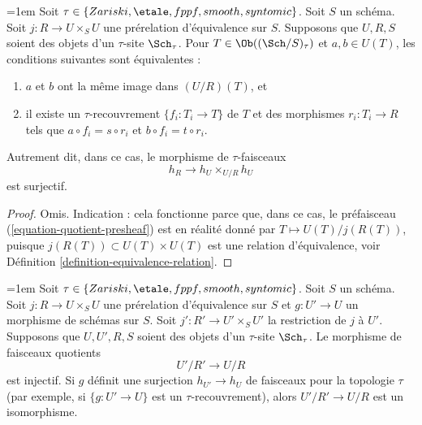 \begin{lemma}\emergencystretch=1em
\label{lemma-quotient-pre-equivalence}
Soit $\tau \in\allowbreak \{Zariski,\allowbreak \etale,\allowbreak fppf,\allowbreak smooth,\allowbreak syntomic\}$.
Soit $S$ un schéma.
Soit $j : R \to U \times_S U$ une prérelation d'équivalence sur $S$.
Supposons que $U, R, S$ soient des objets d'un $\tau$-site $\Sch_\tau$.
Pour $T \in \Ob((\Sch/S)_\tau)$ et
$a, b \in U(T)$, les conditions suivantes sont équivalentes :
\begin{enumerate}
\item $a$ et $b$ ont la même image dans $(U/R)(T)$, et
\item il existe un $\tau$-recouvrement $\{f_i : T_i \to T\}$ de $T$
et des morphismes $r_i : T_i \to R$ tels que
$a \circ f_i = s \circ r_i$ et $b \circ f_i = t \circ r_i$.
\end{enumerate}
Autrement dit, dans ce cas, le morphisme de $\tau$-faisceaux
$$
h_R \longrightarrow h_U \times_{U/R} h_U
$$
est surjectif.
\end{lemma}

\begin{proof}
Omis. Indication : cela fonctionne parce que, dans ce cas, le préfaisceau
(\ref{equation-quotient-presheaf}) est en réalité donné
par $T \mapsto U(T)/j(R(T))$, puisque $j(R(T)) \subset U(T) \times U(T)$
est une relation d'équivalence, voir
Définition \ref{definition-equivalence-relation}.
\end{proof}

\begin{lemma}\emergencystretch=1em
\label{lemma-quotient-pre-equivalence-relation-restrict}
Soit $\tau \in\allowbreak \{Zariski,\allowbreak \etale,\allowbreak fppf,\allowbreak smooth,\allowbreak syntomic\}$.
Soit $S$ un schéma.
Soit $j : R \to U \times_S U$ une prérelation d'équivalence sur $S$
et $g : U' \to U$ un morphisme de schémas sur $S$.
Soit $j' : R' \to U' \times_S U'$ la restriction de $j$ à $U'$.
Supposons que $U, U', R, S$ soient des objets d'un $\tau$-site $\Sch_\tau$.
Le morphisme de faisceaux quotients
$$
U'/R' \longrightarrow U/R
$$
est injectif. Si $g$ définit une surjection $h_{U'} \to h_U$ de faisceaux
pour la topologie $\tau$ (par exemple, si $\{g : U' \to U\}$ est un
$\tau$-recouvrement), alors $U'/R' \to U/R$ est un isomorphisme.
\end{lemma}

